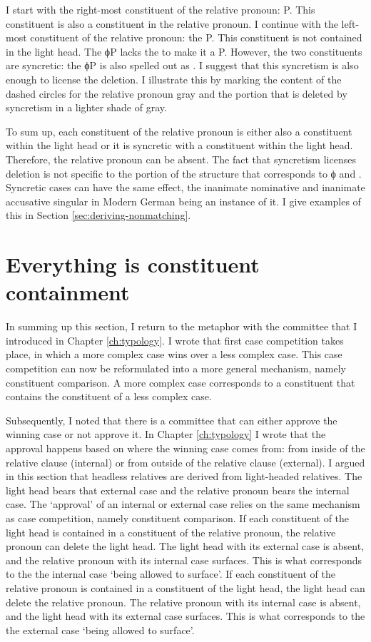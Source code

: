I start with the right-most constituent of the relative pronoun: P. This constituent is also a constituent in the relative pronoun.
I continue with the left-most constituent of the relative pronoun: the P. This constituent is not contained in the light head. The ϕP lacks the  to make it a P. However, the two constituents are syncretic: the ϕP is also spelled out as . I suggest that this syncretism is also enough to license the deletion. I illustrate this by marking the content of the dashed circles for the relative pronoun gray and the portion that is deleted by syncretism in a lighter shade of gray.

To sum up, each constituent of the relative pronoun is either also a constituent within the light head or it is syncretic with a constituent within the light head. Therefore, the relative pronoun can be absent. The fact that syncretism licenses deletion is not specific to the portion of the structure that corresponds to ϕ and . Syncretic cases can have the same effect, the inanimate nominative and inanimate accusative singular in Modern German being an instance of it. I give examples of this in Section \ref{sec:deriving-nonmatching}.

\section{Everything is constituent containment}

In summing up this section, I return to the metaphor with the committee that I introduced in Chapter \ref{ch:typology}. I wrote that first case competition takes place, in which a more complex case wins over a less complex case. This case competition can now be reformulated into a more general mechanism, namely constituent comparison. A more complex case corresponds to a constituent that contains the constituent of a less complex case.

Subsequently, I noted that there is a committee that can either approve the winning case or not approve it. In Chapter \ref{ch:typology} I wrote that the approval happens based on where the winning case comes from: from inside of the relative clause (internal) or from outside of the relative clause (external). I argued in this section that headless relatives are derived from light-headed relatives. The light head bears that external case and the relative pronoun bears the internal case. The `approval' of an internal or external case relies on the same mechanism as case competition, namely constituent comparison. If each constituent of the light head is contained in a constituent of the relative pronoun, the relative pronoun can delete the light head. The light head with its external case is absent, and the relative pronoun with its internal case surfaces. This is what corresponds to the the internal case `being allowed to surface'. If each constituent of the relative pronoun is contained in a constituent of the light head, the light head can delete the relative pronoun. The relative pronoun with its internal case is absent, and the light head with its external case surfaces. This is what corresponds to the the external case `being allowed to surface'.

